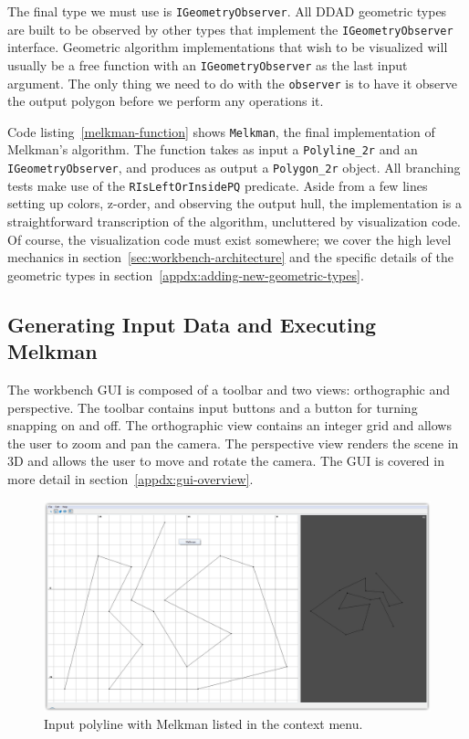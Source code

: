 The final type we must use is \texttt{IGeometryObserver}. All DDAD geometric
types are built to be observed by other types that implement the
\texttt{IGeometryObserver} interface. Geometric algorithm implementations that
wish to be visualized will usually be a free function with an
\texttt{IGeometryObserver} as the last input argument. The only thing we need to
do with the \texttt{observer} is to have it observe the output polygon before we
perform any operations it.

Code listing~\ref{melkman-function} shows \texttt{Melkman}, the final 
implementation of Melkman's algorithm. The function takes as input a 
\texttt{Polyline\_2r} and an \texttt{IGeometryObserver}, and produces as output
a \texttt{Polygon\_2r} object. All branching tests make use of the
\texttt{RIsLeftOrInsidePQ} predicate. Aside from a few lines setting up colors,
z-order, and observing the output hull, the implementation is a straightforward
transcription of the algorithm, uncluttered by visualization code. Of course,
the visualization code must exist somewhere; we cover the high level mechanics
in section~\ref{sec:workbench-architecture} and the specific details of the
geometric types in section~\ref{appdx:adding-new-geometric-types}. 
 



\subsection{Generating Input Data and Executing Melkman} 

The workbench GUI is composed of a toolbar and two views: orthographic and
perspective. The toolbar contains input buttons and a button for turning
snapping on and off. The orthographic view contains an integer grid and allows
the user to zoom and pan the camera. The perspective view renders the scene in
3D and allows the user to move and rotate the camera. The GUI is covered in more
detail in section~\ref{appdx:gui-overview}.

\begin{figure}[H]
	\centering
	\includegraphics[width=\textwidth]{figures/melkman-input-1}
	\caption{Input polyline with Melkman listed in the context menu.} 
	\label{fig:melkman-input}
\end{figure}
 
